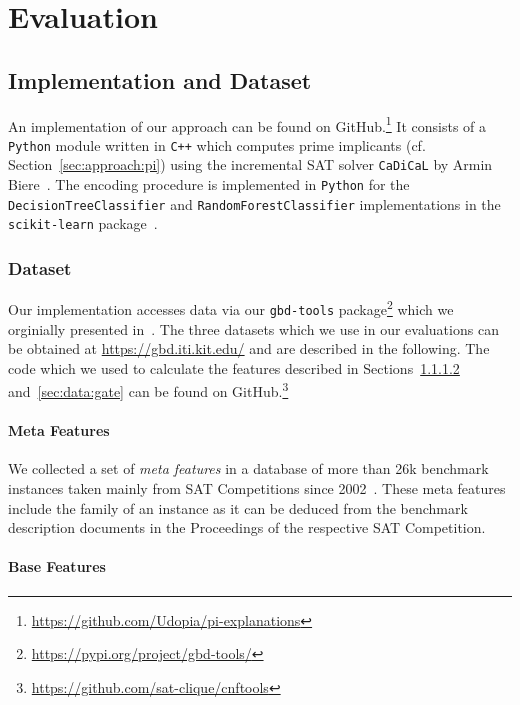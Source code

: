 \documentclass[a4paper, USenglish, cleveref, autoref, thm-restate]{lipics-v2021}
\theoremstyle{definition}
\begin{document}
\section{Evaluation}
\label{sec:evaluation}


\subsection{Implementation and Dataset}
\label{sec:evaluation-impl}

An implementation of our approach can be found on GitHub.\footnote{\url{https://github.com/Udopia/pi-explanations}}
It consists of a \verb!Python! module written in \verb!C++! which computes prime implicants (cf. Section~\ref{sec:approach:pi}) using the incremental SAT solver \verb!CaDiCaL! by Armin Biere~\cite{Biere:2020:Cadical}. 
The encoding procedure is implemented in \verb!Python! for the \verb!DecisionTreeClassifier! and \verb!RandomForestClassifier! implementations in the \verb!scikit-learn! package~\cite{Pedregosa:2011:Scikit}. 


\subsubsection{Dataset}
\label{sec:eval:data}

Our implementation accesses data via our \verb!gbd-tools! package\footnote{\url{https://pypi.org/project/gbd-tools/}} which we orginially presented in~\cite{Iser:2018:GDB}. 
The three datasets which we use in our evaluations can be obtained at \url{https://gbd.iti.kit.edu/} and are described in the following. 
The code which we used to calculate the features described in Sections~\ref{sec:data:base} and~\ref{sec:data:gate} can be found on GitHub.\footnote{\url{https://github.com/sat-clique/cnftools}}


\paragraph{Meta Features}

We collected a set of \emph{meta features} in a database of more than 26k benchmark instances taken mainly from SAT Competitions since 2002~\cite{Froleyks:2021:SC2020}. 
These meta features include the family of an instance as it can be deduced from the benchmark description documents in the Proceedings of the respective SAT Competition. 


\paragraph{Base Features}
\label{sec:data:base}
\end{document}
